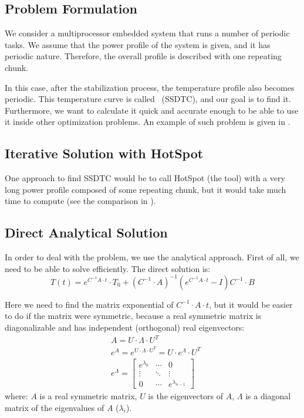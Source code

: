 \subsection{Problem Formulation}
We consider a multiprocessor embedded system that runs a number of periodic tasks. We assume that the power profile of the system is given, and it has periodic nature. Therefore, the overall profile is described with one repeating chunk.

In this case, after the stabilization process, the temperature profile also becomes periodic. This temperature curve is called \ssdtc\ (SSDTC), and our goal is to find it. Furthermore, we want to calculate it quick and accurate enough to be able to use it inside other optimization problems. An example of such problem is given in .

\subsection{Iterative Solution with HotSpot}
One approach to find SSDTC would be to call HotSpot (the tool) with a very long power profile composed of some repeating chunk, but it would take much time to compute (see the comparison in ).

\subsection{Direct Analytical Solution}
In order to deal with the problem, we use the analytical approach. First of all, we need to be able to solve  efficiently. The direct solution is:
\begin{equation} \label{eq:solution}
  T(t) = e^{C^{-1}A \cdot t} \cdot T_0 + (C^{-1} \cdot A)^{-1}(e^{C^{-1}A \cdot t} - I)C^{-1} \cdot B
\end{equation}

Here we need to find the matrix exponential of $C^{-1} \cdot A \cdot t$, but it would be easier to do if the matrix were symmetric, because a real symmetric matrix is diagonalizable and has independent (orthogonal) real eigenvectors:
\begin{align}
  & A = U \cdot \Lambda \cdot U^T \label{eq:eigenvalue-decomposition} \\
  & e^A = e^{U \cdot \Lambda \cdot U^T} = U \cdot e^{\Lambda} \cdot U^T \nonumber \\
  & e^{\Lambda} = \left[
      \begin{array}{ccc}
        e^{\lambda_0} & \cdots & 0 \\
        \vdots & \ddots & \vdots \\
        0 & \cdots & e^{\lambda_{n - 1}}
      \end{array}
    \right] \nonumber
\end{align}
where: $A$ is a real symmetric matrix, $U$ is the eigenvectors of $A$, $\Lambda$ is a diagonal matrix of the eigenvalues of $A$ ($\lambda_i$).

